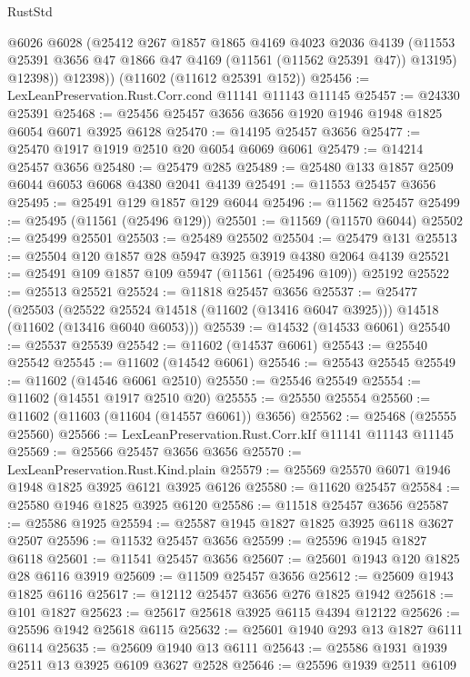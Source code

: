 \begin{lexlean}{RustStd}
\begin{coremodule}
          @6026
          @6028
          (@25412
            @267
            @1857
            @1865
            @4169
            @4023
            @2036
            @4139
            (@11553 @25391 @3656 @47 @1866 @47 @4169 (@11561 (@11562 @25391 @47)) @13195)
            @12398))
        @12398))
    (@11602 (@11612 @25391 @152))
@25456 := LexLeanPreservation.Rust.Corr.cond @11141 @11143 @11145
@25457 := @24330 @25391
@25468 := @25456 @25457 @3656 @3656 @1920 @1946 @1948 @1825 @6054 @6071 @3925 @6128
@25470 := @14195 @25457 @3656
@25477 := @25470 @1917 @1919 @2510 @20 @6054 @6069 @6061
@25479 := @14214 @25457 @3656
@25480 := @25479 @285
@25489 := @25480 @133 @1857 @2509 @6044 @6053 @6068 @4380 @2041 @4139
@25491 := @11553 @25457 @3656
@25495 := @25491 @129 @1857 @129 @6044
@25496 := @11562 @25457
@25499 := @25495 (@11561 (@25496 @129))
@25501 := @11569 (@11570 @6044)
@25502 := @25499 @25501
@25503 := @25489 @25502
@25504 := @25479 @131
@25513 := @25504 @120 @1857 @28 @5947 @3925 @3919 @4380 @2064 @4139
@25521 := @25491 @109 @1857 @109 @5947 (@11561 (@25496 @109)) @25192
@25522 := @25513 @25521
@25524 := @11818 @25457 @3656
@25537 := @25477
    (@25503
      (@25522 @25524 @14518 (@11602 (@13416 @6047 @3925)))
      @14518
      (@11602 (@13416 @6040 @6053)))
@25539 := @14532 (@14533 @6061)
@25540 := @25537 @25539
@25542 := @11602 (@14537 @6061)
@25543 := @25540 @25542
@25545 := @11602 (@14542 @6061)
@25546 := @25543 @25545
@25549 := @11602 (@14546 @6061 @2510)
@25550 := @25546 @25549
@25554 := @11602 (@14551 @1917 @2510 @20)
@25555 := @25550 @25554
@25560 := @11602 (@11603 (@11604 (@14557 @6061)) @3656)
@25562 := @25468 (@25555 @25560)
@25566 := LexLeanPreservation.Rust.Corr.kIf @11141 @11143 @11145
@25569 := @25566 @25457 @3656 @3656
@25570 := LexLeanPreservation.Rust.Kind.plain
@25579 := @25569 @25570 @6071 @1946 @1948 @1825 @3925 @6121 @3925 @6126
@25580 := @11620 @25457
@25584 := @25580 @1946 @1825 @3925 @6120
@25586 := @11518 @25457 @3656
@25587 := @25586 @1925
@25594 := @25587 @1945 @1827 @1825 @3925 @6118 @3627 @2507
@25596 := @11532 @25457 @3656
@25599 := @25596 @1945 @1827 @6118
@25601 := @11541 @25457 @3656
@25607 := @25601 @1943 @120 @1825 @28 @6116 @3919
@25609 := @11509 @25457 @3656
@25612 := @25609 @1943 @1825 @6116
@25617 := @12112 @25457 @3656 @276 @1825 @1942
@25618 := @101 @1827
@25623 := @25617 @25618 @3925 @6115 @4394 @12122
@25626 := @25596 @1942 @25618 @6115
@25632 := @25601 @1940 @293 @13 @1827 @6111 @6114
@25635 := @25609 @1940 @13 @6111
@25643 := @25586 @1931 @1939 @2511 @13 @3925 @6109 @3627 @2528
@25646 := @25596 @1939 @2511 @6109

\end{coremodule}
\end{lexlean}
